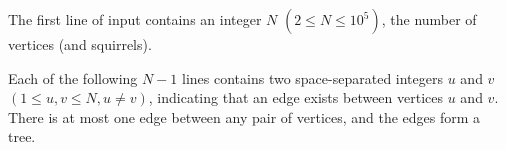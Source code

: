 
The first line of input contains an integer $N$ $(2 \leq N \leq 10^{5})$, the number of vertices (and squirrels).

Each of the following $N-1$ lines contains two space-separated integers $u$ and $v$ $(1 \leq u, v \leq N, u \neq v)$, indicating that an edge exists between vertices $u$ and $v$. There is at most one edge between any pair of vertices, and the edges form a tree.

